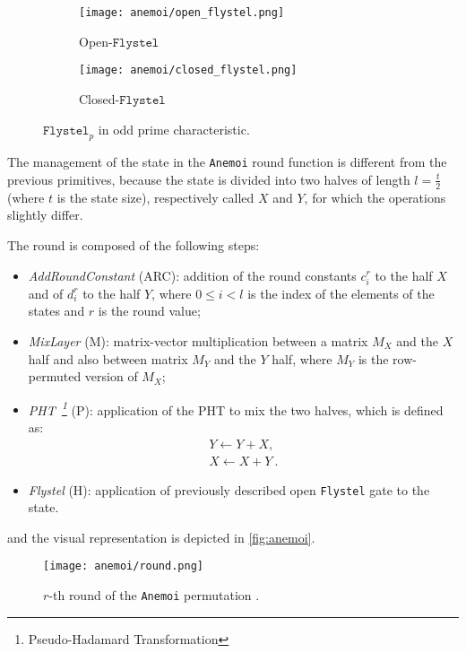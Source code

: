 \documentclass[12pt, a4paper]{report}
\begin{document}
\begin{figure}[H]
  \begin{center}
    \hspace{0.5cm}
    \begin{subfigure}{0.40\textwidth}
      \centering
      \texttt{[image: anemoi/open\_flystel.png]}
      \caption{Open-$\texttt{Flystel}$}\label{subfig:openflystel}
    \end{subfigure}
    \hfill
    \begin{subfigure}{0.40\textwidth}
      \centering
      \texttt{[image: anemoi/closed\_flystel.png]}
      \caption{Closed-$\texttt{Flystel}$}\label{subfig:closedflystel}
    \end{subfigure}
    \hspace{0.5cm}
  \end{center}
  \caption{$\texttt{Flystel}_p$ in odd prime characteristic.}\label{fig:flystel}
\end{figure}

The management of the state in the \texttt{Anemoi} round function is different from the previous primitives, because the state is divided into two halves of length $l = \frac{t}{2}$ (where $t$ is the state size), respectively called $X$ and $Y$, for which the operations slightly differ.

The round is composed of the following steps:
\begin{itemize}
  \item \textit{AddRoundConstant} (ARC): addition of the round constants $c^r_i$ to the half $X$ and of $d^r_i$ to the half $Y$, where $0 \le i < l$ is the index of the elements of the states and $r$ is the round value;
  \item \textit{MixLayer} (M): matrix-vector multiplication between a matrix $M_X$ and the $X$ half and also between matrix $M_Y$ and the $Y$ half, where $M_Y$ is the row-permuted version of $M_X$;
  \item \textit{PHT~\footnote{Pseudo-Hadamard Transformation}} (P): application of the PHT to mix the two halves, which is defined as:
      \begin{gather}
        Y \leftarrow Y + X, \\
        X \leftarrow X + Y\ .
        \label{eq:pht}
      \end{gather}
    \item \textit{Flystel} (H): application of previously described open \texttt{Flystel} gate to the state.
\end{itemize}
and the visual representation is depicted in \autoref{fig:anemoi}.
\begin{figure}[H]
  \begin{center}
    \texttt{[image: anemoi/round.png]}
  \end{center}
  \caption{$r$-th round of the \texttt{Anemoi} permutation \cite[Fig.~6]{anemoi}.}\label{fig:anemoi}
\end{figure}
\end{document}
